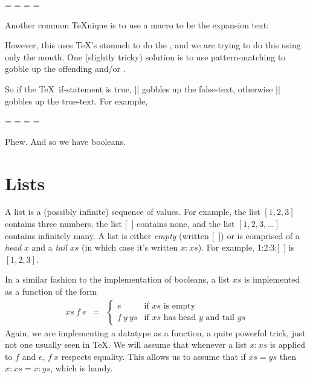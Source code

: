 \begin{teX}
\TeXif\iftrue\True\True
   = \iftrue\True\else\True\fi
   = \True\else\True\fi
   = \else\fi
   =
\end{teX}

Another common \TeX nique is to use a macro  to
be the expansion text:
However, this uses \TeX's stomach to do the , and we are
trying to do this using only the mouth.  One (slightly tricky) solution
is to use pattern-matching to gobble up the offending  and/or
.




So if the \TeX\ if-statement is true, |\gobblefalse| gobbles
up the false-text, otherwise |\gobbletrue| gobbles up the 
true-text.  For example,

\begin{teX}
\TeXif\iftrue\True\True
   = \iftrue\gobblefalse\else
         \gobbletrue\fi\True\True
   = \gobblefalse\else
         \gobbletrue\fi\True\True
   = \fi\True
   = \True
\end{teX}

Phew.  And so we have booleans.


\section{Lists}
\def\nil{[~]\xspace}

A list is a (possibly infinite) sequence of values.  For example,
the list $[1,2,3]$ contains three numbers, the list \nil contains
none, and the list $[1,2,3,\ldots]$ contains infinitely many.
A list is either {\em empty\/} (written \nil) or is comprised
of a {\em head\/}
$x$ and a {\em tail\/} $xs$ (in which case it's written $x:xs$).
For example, 1:2:3:\nil is $[1,2,3]$.  

In a similar fashion to the implementation of booleans,
a list $xs$ is implemented as a function of the form
\begin{eqnarray*}
   xs~f~e  &
   =  &
   \left\{
      \begin{array}{ll}
         e       &  \mbox{if $xs$ is empty}  \\
         f~y~ys  &  \mbox{if $xs$ has head $y$ and tail $ys$}
      \end{array}
   \right.
\end{eqnarray*}
Again, we are implementing a datatype as a function, a quite powerful
trick, just not one usually seen in \TeX.  We will assume that
whenever a list $x:xs$ is applied to $f$ and $e$, $f~x$ respects equality.
This allows us to assume that if $xs = ys$ then $x:xs = x:ys$,
which is handy.  

